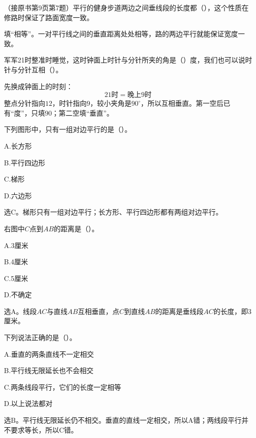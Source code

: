 （接原书第9页第7题）平行的健身步道两边之间垂线段的长度都（\hspace{1.8em}），这个性质在修路时保证了路面宽度一致。\par
\begin{BookAnswer}
填“相等”。一对平行线之间的垂直距离处处相等，路的两边平行就能保证宽度一致。
\end{BookAnswer}

军军21时整准时睡觉，这时钟面上时针与分针所夹的角是（\hspace{1.8em}）度，我们也可以说时针与分针互相（\hspace{1.8em}）。\par
\begin{BookAnswer}
先换成钟面上的时刻：\[21\text{时}=\text{晚上}9\text{时}\]整点分针指向\(12\)，时针指向\(9\)，较小夹角是\(90^\circ\)，所以互相垂直。第一空后已有“度”，只填\(90\)；第二空填“垂直”。
\end{BookAnswer}

下列图形中，只有一组对边平行的是（\hspace{1.8em}）。\par
\noindent A.长方形\par
\noindent B.平行四边形\par
\noindent C.梯形\par
\noindent D.六边形\par
\begin{BookAnswer}
选\(\mathrm C\)。梯形只有一组对边平行；长方形、平行四边形都有两组对边平行。
\end{BookAnswer}

右图中\(C\)点到\(AB\)的距离是（\hspace{1.8em}）。\par
\noindent A.3厘米\par
\noindent B.4厘米\par
\noindent C.5厘米\par
\noindent D.不确定\par
{}
\begin{BookAnswer}
选\(\mathrm A\)。线段\(AC\)与直线\(AB\)互相垂直，点\(C\)到直线\(AB\)的距离是垂线段\(AC\)的长度，即\(3\)厘米。
\end{BookAnswer}

下列说法正确的是（\hspace{1.8em}）。\par
\noindent A.垂直的两条直线不一定相交\par
\noindent B.平行线无限延长也不会相交\par
\noindent C.两条线段平行，它们的长度一定相等\par
\noindent D.以上说法都对\par
\begin{BookAnswer}
选\(\mathrm B\)。平行线无限延长仍不相交。垂直的直线一定相交，所以\(\mathrm A\)错；两线段平行并不要求等长，所以\(\mathrm C\)错。
\end{BookAnswer}

